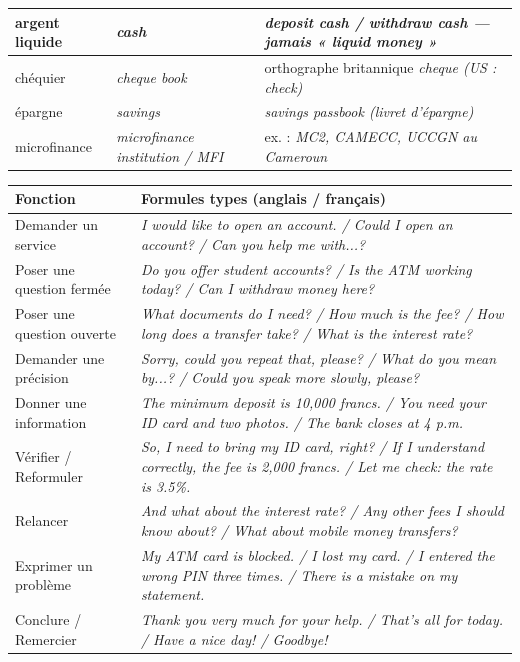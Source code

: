 \documentclass[11pt]{article}
\newcommand{\cle}[1]{{\popxbold\color{popdark}#1}}
\newcounter{popsec}
\newcounter{popsub}
\newcommand{\courssub}[1]{%
  \stepcounter{popsub}%
  \par\vspace{9pt}\noindent{\popxbold\fontsize{11.5}{13}\selectfont\color{popink}{\color{poporange}\thepopsec.\thepopsub}\hspace{6pt}#1}\par\nopagebreak\vspace{4pt}
}
\newcommand{\eng}[1]{\ifmmode\text{\textit{#1}}\else\begingroup\selectlanguage{english}\itshape #1\endgroup\fi}
\begin{document}
\begin{propriete}
\begin{center}
\begin{tabularx}{\linewidth}{|X|X|X|}
\hline
argent liquide & \eng{cash} & \eng{deposit cash} / \eng{withdraw cash} — \textbf{jamais} « liquid money » \\
\hline
chéquier & \eng{cheque book} & orthographe britannique \eng{cheque} (US : \eng{check}) \\
\hline
épargne & \eng{savings} & \eng{savings passbook} (livret d'épargne) \\
\hline
microfinance & \eng{microfinance institution} / \eng{MFI} & ex. : \eng{MC2}, \eng{CAMECC}, \eng{UCCGN} au Cameroun \\
\hline
\end{tabularx}
\end{center}
\end{propriete}

\courssub{Formules fonctionnelles}

\begin{propriete}
\begin{center}
\begin{tabularx}{\linewidth}{|l|X|}
\hline
\rowcolor{popblueL} \textbf{Fonction} & \textbf{Formules types (anglais / français)} \\
\hline
\cle{Demander un service} & \eng{I would like to open an account.} / \eng{Could I open an account?} / \eng{Can you help me with...?} \\
\hline
\cle{Poser une question fermée} & \eng{Do you offer student accounts?} / \eng{Is the ATM working today?} / \eng{Can I withdraw money here?} \\
\hline
\cle{Poser une question ouverte} & \eng{What documents do I need?} / \eng{How much is the fee?} / \eng{How long does a transfer take?} / \eng{What is the interest rate?} \\
\hline
\cle{Demander une précision} & \eng{Sorry, could you repeat that, please?} / \eng{What do you mean by...?} / \eng{Could you speak more slowly, please?} \\
\hline
\cle{Donner une information} & \eng{The minimum deposit is 10,000 francs.} / \eng{You need your ID card and two photos.} / \eng{The bank closes at 4 p.m.} \\
\hline
\cle{Vérifier / Reformuler} & \eng{So, I need to bring my ID card, right?} / \eng{If I understand correctly, the fee is 2,000 francs.} / \eng{Let me check: the rate is 3.5\%.} \\
\hline
\cle{Relancer} & \eng{And what about the interest rate?} / \eng{Any other fees I should know about?} / \eng{What about mobile money transfers?} \\
\hline
\cle{Exprimer un problème} & \eng{My ATM card is blocked.} / \eng{I lost my card.} / \eng{I entered the wrong PIN three times.} / \eng{There is a mistake on my statement.} \\
\hline
\cle{Conclure / Remercier} & \eng{Thank you very much for your help.} / \eng{That's all for today.} / \eng{Have a nice day!} / \eng{Goodbye!} \\
\hline
\end{tabularx}
\end{center}
\end{propriete}
\end{document}
